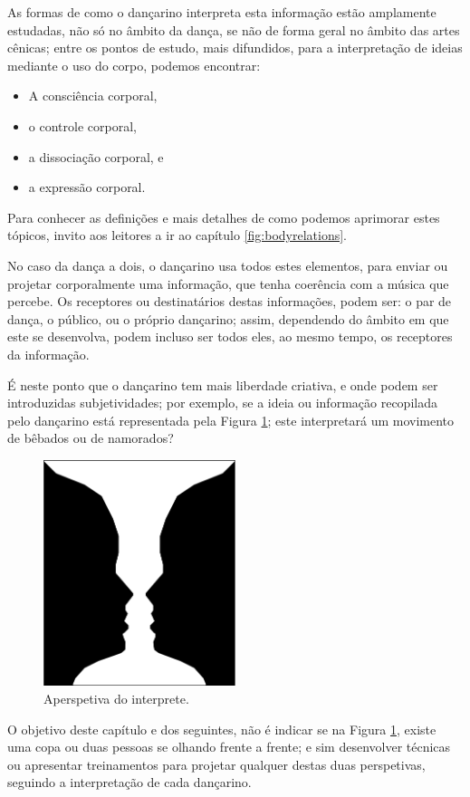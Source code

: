 As formas de como o dançarino interpreta esta informação estão amplamente estudadas,
não só no âmbito da dança, se não de forma geral no âmbito das artes cênicas;
entre os pontos de estudo, mais difundidos, 
para a interpretação de ideias  mediante o uso do corpo, podemos encontrar:
\begin{itemize}
\item A consciência corporal,
\item o controle corporal,
\item a dissociação corporal, e
\item a expressão corporal.
\end{itemize}
Para conhecer as definições e mais detalhes de como podemos aprimorar estes tópicos,
invito aos leitores a ir ao capítulo \ref{fig:bodyrelations}.

No caso da dança a dois, o dançarino usa todos estes elementos, 
para enviar ou projetar corporalmente uma informação, que tenha coerência com a música que percebe.
Os receptores ou destinatários destas informações, podem ser: o par de dança,
o público, ou o próprio dançarino; 
assim, dependendo do âmbito em que este se desenvolva,
podem incluso ser todos eles, ao mesmo tempo, os receptores da informação.

É neste ponto que o dançarino tem mais liberdade criativa, 
e onde podem ser introduzidas subjetividades; por exemplo,
se a ideia ou informação recopilada pelo dançarino está representada pela Figura \ref{fig:LaCopaDeRubin};
este interpretará um  movimento de bêbados ou de namorados?
\begin{figure}[!h]
  \centering
    \includegraphics[width=0.5\textwidth]{chapters/cap-musicalidade/LaCopaDeRubin.eps}
\caption{Aperspetiva do interprete.}
\label{fig:LaCopaDeRubin}
\end{figure}

O objetivo deste capítulo e dos seguintes, não é indicar se na Figura \ref{fig:LaCopaDeRubin},
existe uma copa ou duas pessoas se olhando frente a frente; e sim desenvolver técnicas ou 
apresentar treinamentos para projetar qualquer destas duas perspetivas, seguindo a interpretação de cada dançarino.



